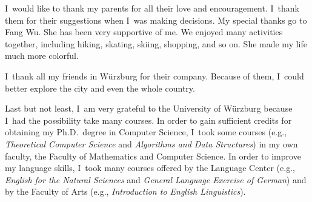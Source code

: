 {I~would like to thank my parents
for all their love and encouragement.
I~thank them for their suggestions 
when I~was making decisions.
My special thanks go to Fang Wu.
She has been very supportive of me.
We enjoyed many activities together, 
including hiking, skating, skiing, shopping, and so on.
She made my life much more colorful.

I~thank all my friends in W\"urzburg
for their company.
Because of them, I~could better explore the city 
and even the whole country.

Last but not least, 
I~am very grateful to the University of W\"urzburg 
because I~had the possibility take many courses.
In order to gain sufficient credits for 
obtaining my Ph.D.\ degree in Computer Science,
I~took some courses
(e.g., \emph{Theoretical Computer Science}
and \emph{Algorithms and Data Structures})
in my own faculty, 
the Faculty of Mathematics and Computer Science.
%
In order to improve my language skills,
I~took many courses
offered by the Language Center
(e.g., \emph{English for the Natural Sciences} 
and \emph{General Language Exercise of German})
and by the Faculty of Arts 
(e.g., \emph{Introduction to English Linguistics}).

}